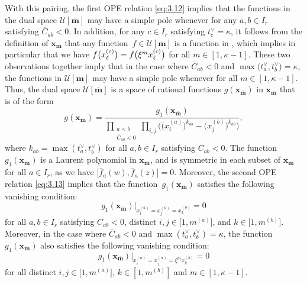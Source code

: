 \documentclass[10pt,a4paper]{amsart}
\numberwithin{equation}{section}
\begin{document}
With this pairing, the first OPE relation \eqref{eq:3.12} implies that the functions in the dual space $\mathcal{U}[\overline{\mathbf{m}}]$ may have a simple pole whenever  for any $a,b\in I_r$ satisfying $\overline{C}_{ab}<0$. In addition, for any $c\in I_r$ satisfying $t_c^{\vee}=\kappa$, it follows from the definition of $\mathbf{x}_{\overline{\mathbf{m}}}$ that any function~${f\in\mathcal{U}[\overline{\mathbf{m}}]}$ is a function in , which implies in particular that we have $\smash{f\bigl(x_{\ell}^{(c)}\bigr)}=\smash{f\bigl(\xi^mx_{\ell}^{(c)}\bigr)}$ for all $m\in[1,\kappa-1]$. These two observations together imply that in the case where $\overline{C}_{ab}<0$ and $\max\bigl(t_a^{\vee},t_b^{\vee}\bigr)= \kappa$, the functions in $\mathcal{U}[\overline{\mathbf{m}}]$ may have a simple pole whenever  for all $m\in[1,\kappa-1]$. Thus, the dual space $\mathcal{U}[\overline{\mathbf{m}}]$ is a space of rational functions $g(\mathbf{x}_{\overline{\mathbf{m}}})$ in $\mathbf{x}_{\overline{\mathbf{m}}}$ that is of the form
\begin{equation}\label{eq:3.18}
g(\mathbf{x}_{\overline{\mathbf{m}}})
=\frac{g_1(\mathbf{x}_{\overline{\mathbf{m}}})}{ \prod_{\substack{a<b\\\overline{C}_{ab}<0}} \prod_{i,j}\bigl(\bigl(x_i^{(a)}\bigr)^{k_{ab}}-\bigl(x_j^{(b)}\bigr)^{k_{ab}}\bigr)},
\end{equation}
where $k_{ab}=\max(t_a^{\vee},t_b^{\vee})$ for all $a,b\in I_r$ satisfying $\overline{C}_{ab}<0$. The function $g_1(\mathbf{x}_{\overline{\mathbf{m}}})$ is a Laurent polynomial in $\mathbf{x}_{\overline{\mathbf{m}}}$, and is symmetric in each subset  of $\mathbf{x}_{\overline{\mathbf{m}}}$ for all $a\in I_r$, as we have $\bigl[\overline{f}_a(w), \overline{f}_a(z)\bigr]=0$. Moreover, the second OPE relation \eqref{eq:3.13} implies that the function~$g_1(\mathbf{x}_{\overline{\mathbf{m}}})$ satisfies the following vanishing condition:
\begin{equation}\label{eq:3.19}
g_1(\mathbf{x}_{\overline{\mathbf{m}}})\big|_{x_i^{(a)}=x_j^{(a)}=x_k^{(b)}}=0
\end{equation}
for all $a,b\in I_r$ satisfying $\overline{C}_{ab}<0$, distinct $i,j\in \bigl[1,m^{(a)}\bigr]$, and $k\in\bigl[1,m^{(b)}\bigr]$. Moreover, in the case where $\overline{C}_{ab}<0$ and $\max(t_a^{\vee},t_b^{\vee})= \kappa$, the function $g_1(\mathbf{x}_{\overline{\mathbf{m}}})$ also satisfies the following vanishing condition:
\begin{equation}\label{eq:3.20}
g_1(\mathbf{x}_{\overline{\mathbf{m}}})\big|_{x_i^{(a)}=x_j^{(a)}=\xi^m x_k^{(b)}}=0
\end{equation}
for all distinct $i,j\in \bigl[1,m^{(a)}\bigr]$, $k\in[1,m^{(b)}]$ and $m\in[1,\kappa-1]$.
\end{document}
